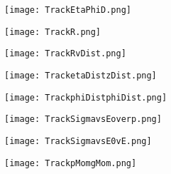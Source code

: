 \documentclass{beamer}
\begin{document}
\begin{frame}
  \begin{figure}[h!]
  \centering
  \texttt{[image: TrackEtaPhiD.png]}
  \end{figure}
\end{frame}

\begin{frame}
  \begin{figure}[h!]
  \centering
  \texttt{[image: TrackR.png]}
  \end{figure}
\end{frame}

\begin{frame}
  \begin{figure}[h!]
  \centering
  \texttt{[image: TrackRvDist.png]}
  \end{figure}
\end{frame}

\begin{frame}
  \begin{figure}[h!]
  \centering
  \texttt{[image: TracketaDistzDist.png]}
  \end{figure}
\end{frame}

\begin{frame}
  \begin{figure}[h!]
  \centering
  \texttt{[image: TrackphiDistphiDist.png]}
  \end{figure}
\end{frame}

\begin{frame}
  \begin{figure}[h!]
  \centering
  \texttt{[image: TrackSigmavsEoverp.png]}
  \end{figure}
\end{frame}

\begin{frame}
  \begin{figure}[h!]
  \centering
  \texttt{[image: TrackSigmavsE0vE.png]}
  \end{figure}
\end{frame}

\begin{frame}
  \begin{figure}[h!]
  \centering
  \texttt{[image: TrackpMomgMom.png]}
  \end{figure}
\end{frame}
\end{document}
